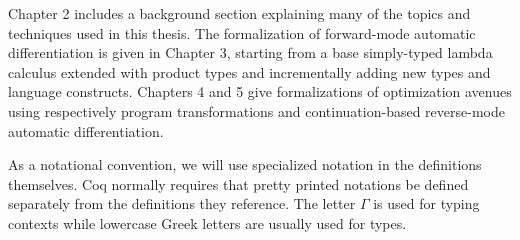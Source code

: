 Chapter 2 includes a background section explaining many of the topics and techniques used in this thesis. The formalization of forward-mode automatic differentiation is given in Chapter 3, starting from a base simply-typed lambda calculus extended with product types and incrementally adding new types and language constructs. Chapters 4 and 5 give formalizations of optimization avenues using respectively program transformations and continuation-based reverse-mode automatic differentiation.

As a notational convention, we will use specialized notation in the definitions themselves. Coq normally requires that pretty printed notations be defined separately from the definitions they reference. The letter $\Gamma$ is used for typing contexts while lowercase Greek letters are usually used for types.
